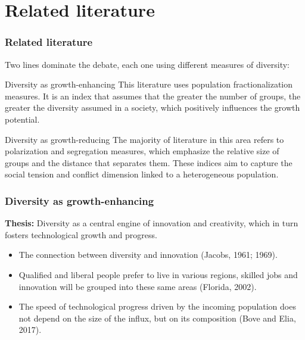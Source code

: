 \documentclass[pdftex,12pt,xcolor=pdftex,table]{beamer}
\begin{document}
\section{Related literature} 

\begin{frame}
\frametitle{Related literature}
\small{
Two lines dominate the debate, each one using different measures of diversity:
\begin{block}{Diversity as growth-enhancing}
This literature uses population fractionalization measures. It is an index that assumes that the greater the number of groups, the greater the diversity assumed in a society, which positively influences the growth potential. 
\end{block}

\begin{block}{Diversity as growth-reducing}
The majority of literature in this area refers to polarization and segregation measures, which emphasize the relative size of groups and the distance that separates them. These indices aim to capture the social tension and conflict dimension linked to a heterogeneous population.
\end{block}
}

\end{frame}


\begin{frame}
\frametitle{Diversity as growth-enhancing}

\small{
\textbf{Thesis:} Diversity as a central engine of innovation and creativity, which in turn fosters technological growth and progress.

\begin{itemize}
\item The connection between diversity and innovation (Jacobs, 1961; 1969).
\item Qualified and liberal people prefer to live in various regions, skilled jobs and innovation will be grouped into these same areas (Florida, 2002).
\item The speed of technological progress driven by the incoming population does not depend on the size of the influx, but on its composition (Bove and Elia, 2017).
\end{itemize}
}


\end{frame}

\end{document}
